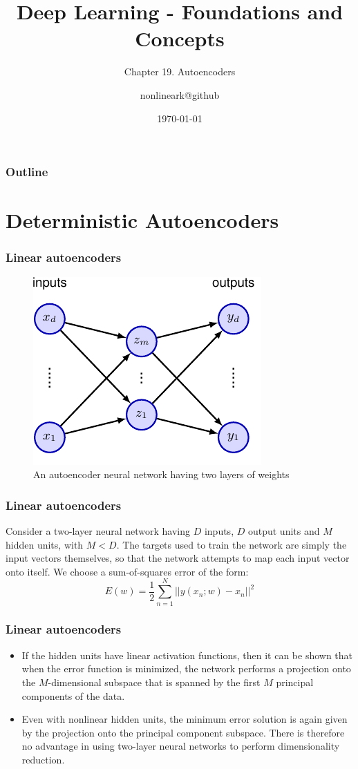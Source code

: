 \documentclass{beamer}
\title{Deep Learning - Foundations and Concepts}
\subtitle{Chapter 19. Autoencoders}
\author{nonlineark@github}
\date{\today}
\begin{document}
\begin{frame}
    \titlepage
\end{frame}

\begin{frame}
    \frametitle{Outline}
    \tableofcontents
\end{frame}

\section{Deterministic Autoencoders}

\begin{frame}
    \frametitle{Linear autoencoders}
    \begin{figure}
        \caption{An autoencoder neural network having two layers of weights}
        \includegraphics{Figure_1.pdf}
    \end{figure}
\end{frame}

\begin{frame}
    \frametitle{Linear autoencoders}
    Consider a two-layer neural network having $D$ inputs, $D$ output units and $M$ hidden units, with $M<D$. The targets used to train the network are simply the input vectors themselves, so that the network attempts to map each input vector onto itself. We choose a sum-of-squares error of the form:
    \begin{equation*}
        E(w)=\frac{1}{2}\sum_{n=1}^{N}||y(x_{n};w)-x_{n}||^{2}
    \end{equation*}
\end{frame}

\begin{frame}
    \frametitle{Linear autoencoders}
    \begin{itemize}
        \item If the hidden units have linear activation functions, then it can be shown that when the error function is minimized, the network performs a projection onto the $M$-dimensional subspace that is spanned by the first $M$ principal components of the data.
        \item Even with nonlinear hidden units, the minimum error solution is again given by the projection onto the principal component subspace. There is therefore no advantage in using two-layer neural networks to perform dimensionality reduction.
    \end{itemize}
\end{frame}
\end{document}
